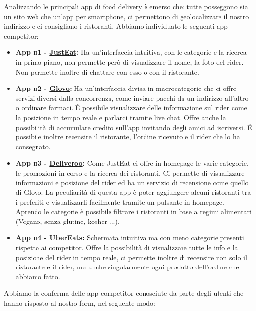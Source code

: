 \documentclass{article}
\begin{document}
     \par
    Analizzando le principali app di food delivery è emerso che: tutte posseggono sia un sito web che un'app per smartphone, ci permettono di geolocalizzare il nostro indirizzo e ci consigliano i ristoranti.
    Abbiamo individuato le seguenti app competitor:
\begin{itemize}
        \item \textbf{App n1 - \href{https://www.justeat.it}{JustEat}:} Ha un’interfaccia intuitiva, con le categorie e la ricerca in primo piano, non permette però di visualizzare il nome, la foto del rider. Non permette inoltre di chattare con esso o con il ristorante.

        \item \textbf{App n2 - \href{https://glovoapp.com/it/it/}{Glovo}:} Ha un'interfaccia divisa in macrocategorie che ci offre servizi diversi dalla concorrenza, come inviare pacchi da un indirizzo all’altro o ordinare farmaci. É possibile visualizzare delle informazione sul rider come la posizione in tempo reale e parlarci tramite live chat. Offre anche la possibilità di accumulare credito sull’app invitando degli amici ad iscriversi. É possibile inoltre recensire il ristorante, l’ordine ricevuto e il rider che lo ha consegnato.

        \item \textbf{App n3 - \href{https://deliveroo.it/it/}{Deliveroo}:} Come JustEat ci offre in homepage le varie categorie, le promozioni in corso e la ricerca dei ristoranti. Ci permette di visualizzare informazioni e posizione del rider ed ha un servizio di recensione come quello di Glovo. La peculiarità di questa app è poter aggiungere alcuni ristoranti tra i preferiti e visualizzarli facilmente tramite un pulsante in homepage. Aprendo le categorie è possibile filtrare i ristoranti in base a regimi alimentari (Vegano, senza glutine, kosher ...).

        \item \textbf{App n4 - \href{https://www.ubereats.com/it}{UberEats}:} Schermata intuitiva ma con meno categorie presenti rispetto ai competitor. Offre la possibilità di visualizzare tutte le info e la posizione del rider in tempo reale, ci permette inoltre di recensire non solo il ristorante e il rider, ma anche singolarmente ogni prodotto dell’ordine che abbiamo fatto.

    

\end{itemize}Abbiamo la conferma delle app competitor conosciute da parte degli utenti che hanno risposto al nostro form, nel seguente modo:
\end{document}
